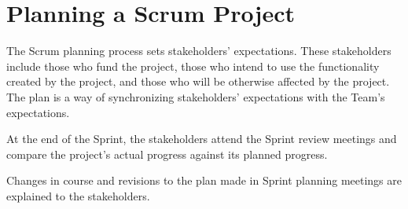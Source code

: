 \pagebreak
\chapter{Planning a Scrum Project}

The Scrum planning process sets stakeholders’ expectations. These stakeholders include those who fund the project, those who intend to use the functionality created by the project, and those who will be otherwise affected by the project. The plan is a way of synchronizing stakeholders’ expectations with the Team’s expectations.

At the end of the Sprint, the stakeholders attend the Sprint review meetings and compare the project’s actual progress against its planned progress.

Changes in course and revisions to the plan made in Sprint planning meetings are explained to the stakeholders.